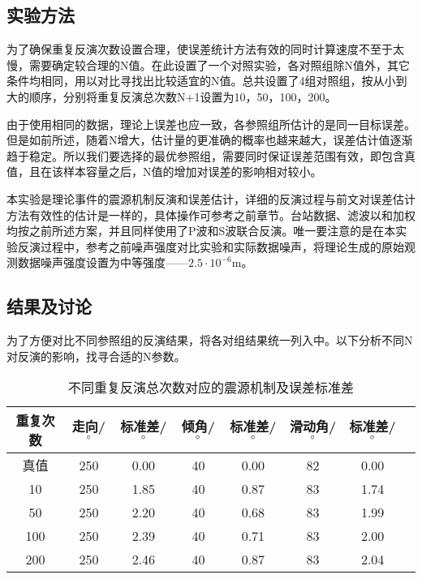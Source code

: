 \subsection{实验方法}
为了确保重复反演次数设置合理，使误差统计方法有效的同时计算速度不至于太慢，需要确定较合理的N值。在此设置了一个对照实验，各对照组除N值外，其它条件均相同，用以对比寻找出比较适宜的N值。总共设置了4组对照组，按从小到大的顺序，分别将重复反演总次数N+1设置为10，50，100，200。

由于使用相同的数据，理论上误差也应一致，各参照组所估计的是同一目标误差。但是如前所述，随着N增大，估计量的更准确的概率也越来越大，误差估计值逐渐趋于稳定。所以我们要选择的最优参照组，需要同时保证误差范围有效，即包含真值，且在该样本容量之后，N值的增加对误差的影响相对较小。

本实验是理论事件的震源机制反演和误差估计，详细的反演过程与前文对误差估计方法有效性的估计是一样的，具体操作可参考之前章节。台站数据、滤波以和加权均按之前所述方案，并且同样使用了P波和S波联合反演。唯一要注意的是在本实验反演过程中，参考之前噪声强度对比实验和实际数据噪声，将理论生成的原始观测数据噪声强度设置为中等强度——$2.5\cdot10^{-6}$m。

\subsection{结果及讨论}
为了方便对比不同参照组的反演结果，将各对组结果统一列入中。以下分析不同N对反演的影响，找寻合适的N参数。
\begin{table}[ht]
\centering
\caption{不同重复反演总次数对应的震源机制及误差标准差}
\label{tab3_07}
    \begin{tabular}{c c c c c c c c}
    \hline
    重复次数 & 走向/$^\circ$ & 标准差/$^\circ$ & 倾角/$^\circ$ & 标准差/$^\circ$ & 滑动角/$^\circ$ & 标准差/$^\circ$\\
    \hline
    真值		& 250 & 0.00 & 40 & 0.00 & 82 & 0.00 \\
    10			& 250 & 1.85 & 40 & 0.87 & 83 & 1.74 \\
    50			& 250 & 2.20 & 40 & 0.68 & 83 & 1.99 \\
    100		& 250 & 2.39 & 40 & 0.71 & 83 & 2.00 \\
    200		& 250 & 2.46 & 40 & 0.87 & 83 & 2.04 \\
    \hline
    \end{tabular}
\end{table}

